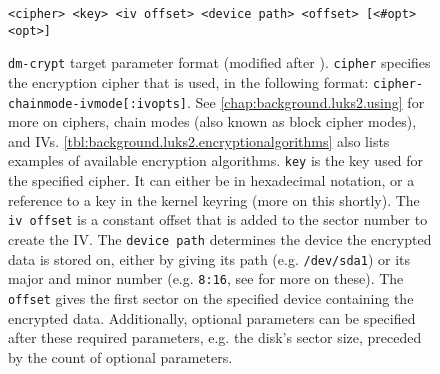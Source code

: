 \begin{figure}[htb!]
	\center
	\begin{mdframed}
		\texttt{<cipher> <key> <iv offset> <device path> <offset> [<\#opt> <opt>]}
	\end{mdframed}
	\caption[
		\texttt{dm-crypt} target parameter format
	]{
		\texttt{dm-crypt} target parameter format (modified after \cite{Dmcrypt2020}). \texttt{cipher} specifies the encryption cipher that is used, in the following format: \texttt{cipher-chainmode-ivmode[:ivopts]}. See \autoref{chap:background.luks2.using} for more on ciphers, chain modes (also known as block cipher modes), and IVs. \autoref{tbl:background.luks2.encryptionalgorithms} also lists examples of available encryption algorithms. \texttt{key} is the key used for the specified cipher. It can either be in hexadecimal notation, or a reference to a key in the kernel keyring (more on this shortly). The \texttt{iv offset} is a constant offset that is added to the sector number to create the IV. The \texttt{device path} determines the device the encrypted data is stored on, either by giving its path (e.g. \texttt{/dev/sda1}) or its major and minor number (e.g. \texttt{8:16}, see \cite{Corbet2005} for more on these). The \texttt{offset} gives the first sector on the specified device containing the encrypted data. Additionally, optional parameters can be specified after these required parameters, e.g. the disk's sector size, preceded by the count of optional parameters.
	}
	\label{fig:otherapproaches.linux.dmcryptparameters}
\end{figure}




